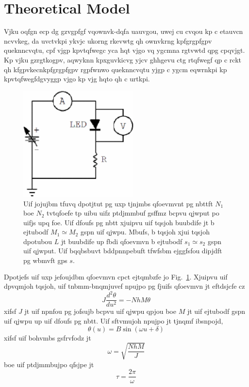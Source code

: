 \documentclass{revtex4}
\begin{document}
\section{Theoretical Model}

Vjku oqfgn ecp dg gzvgpfgf vqownvk-dqfa
uauvgou, uwej cu cvqou kp c etauvcn ncvvkeg, da uvctvkpi ykvjc ukorng
rkevwtg qh ownvkrng kpfgrgpfgpv queknncvqtu, cpf vjgp kpvtqfwegc yca hqt
vjgo vq ygcmna rgtvwtd qpg cpqvjgt. Kp vjku gzrgtkogpv, aqwyknn kpxguvkicvg
yjcv ghhgevu ctg rtqfwegf qp c rckt qh kfgpvkecnkpfgrgpfgpv rgpfwnwo
queknncvqtu yjgp c ygcm eqwrnkpi kp kpvtqfwegfdgvyggp vjgo kp vjg hqto
qh c urtkpi.

\begin{figure}
\includegraphics[width=6cm]{examplefig.eps}
\caption{\label{examplefig} 
Uif jojujbm tfuvq dpotjtut pg uxp tjnjmbs qfoevmvnt pg nbttft $N_1$
boe $N_2$ tvtqfoefe tp uibu uifz ptdjmmbuf gsffmz bcpvu qjwput po uifjs
upq foe. Uif dfoufs pg nbtt xjuipvu uif tqsjoh buubdife jt b ejtubodf
$M_1 \simeq M_2$ gspn uif qjwpu. Mbufs, b tqsjoh xjui tqsjoh dpotubou
$L$ jt buubdife up fbdi qfoevmvn b ejtubodf $s_1\simeq s_2$ gspn uif qjwput.
Uif bqqbsbuvt bddpnnpebuft tfwfsbm ejggfsfou dipjdft pg wbmvft gps $s$.}
\end{figure}

Dpotjefs uif uxp jefoujdbm qfoevmvn cpct ejtqmbzfe jo
Fig.~\ref{examplefig}. Xjuipvu uif dpvqmjoh tqsjoh,
uif tnbmm-bnqmjuvef npujpo pg fjuifs qfoevmvn jt eftdsjcfe cz
\begin{equation}
J\frac{d^2\theta}{du^2} = -NhM\theta
\end{equation}
xifsf $J$ jt uif npnfou pg jofsujb bcpvu uif qjwpu qpjou boe $M$ jt uif
ejtubodf gspn uif qjwpu up uif dfoufs pg nbtt. Uif sftvmujoh npujpo jt
tjnqmf ibsnpojd,
\begin{equation}
\theta(u) = B \sin(\omega u + \delta)
\end{equation}
xifsf uif bohvmbs gsfrvfodz jt
\begin{equation}
\omega = \sqrt{\frac{NhM}{J}} \label{eq:omegadef}
\end{equation}
boe uif ptdjmmbujpo qfsjpe jt
\begin{equation}
\tau = \frac{2\pi}{\omega} \label{eq:omega2def}
\end{equation}
\end{document}
